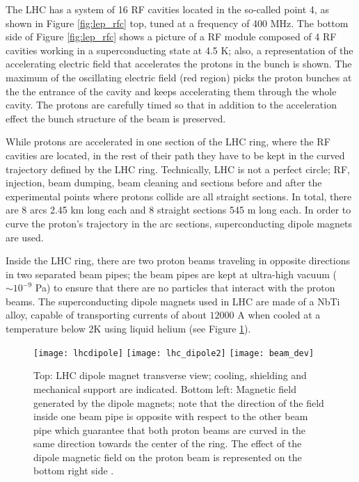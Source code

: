 The LHC has a system of 16 RF cavities located in the so-called point 4, as shown in Figure \ref{fig:lep_rfc} top, tuned at a frequency of 400 MHz. The bottom side of Figure \ref{fig:lep_rfc} shows a picture of a RF module composed of 4 RF cavities working in a superconducting state at 4.5 K; also, a representation of the accelerating electric field that accelerates the protons in the bunch is shown. The maximum of the oscillating electric field (red region) picks the proton bunches at the the entrance of the cavity and keeps accelerating them through the whole cavity. The protons are carefully timed so that in addition to the acceleration effect the bunch structure of the beam is preserved.    

While protons are accelerated in one section of the LHC ring, where the RF cavities are located, in the rest of their path they have to be kept in the curved trajectory defined by the LHC ring. Technically, LHC is not a perfect circle; RF, injection, beam dumping, beam cleaning and sections before and after the experimental points where protons collide are all straight sections. In total, there are 8 arcs 2.45 km long each and 8 straight sections 545 m long each. In order to curve the proton's trajectory in the arc sections, superconducting dipole magnets are used.               

Inside the LHC ring, there are two proton beams traveling in opposite directions in two separated beam pipes; the beam pipes are kept at ultra-high vacuum ($\sim 10^{-9}$ Pa) to ensure that there are no particles that interact with the proton beams. The superconducting dipole magnets used in LHC are made of a NbTi alloy, capable of transporting currents of about $12000$ A when cooled at a temperature below 2K using liquid helium (see Figure \ref{fig:lhcdipole}).

\begin{figure}[!h]
\centering
\texttt{[image: lhcdipole]}
\texttt{[image: lhc\_dipole2]}
\texttt{[image: beam\_dev]}
\caption [LHC dipole magnet.]{Top: LHC dipole magnet transverse view; cooling, shielding and mechanical support are indicated. Bottom left: Magnetic field generated by the dipole magnets; note that the direction of the field inside one beam pipe is opposite with respect to the other beam pipe which guarantee that both proton beams are curved in the same direction towards the center of the ring. The effect of the dipole magnetic field on the proton beam is represented on the bottom right side \cite{lhc_dipole, dipole_field,video}.}\label{fig:lhcdipole}
\end{figure}

